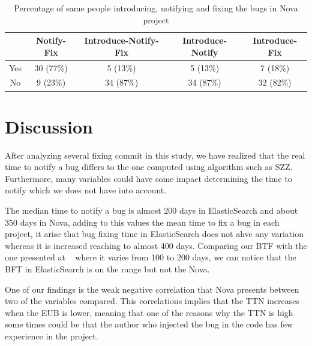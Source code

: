 \documentclass[10pt, conference]{IEEEtran}
\begin{document}
\begin{table}[!t]
\renewcommand{\arraystretch}{1.3}
\label{tableIII}
\centering
\caption{Percentage of same people introducing, notifying and fixing the bugs in Nova project}
\begin{tabular}{|c||c||c||c||c| }
\hline
  & Notify-Fix & Introduce-Notify-Fix & Introduce-Notify & Introduce-Fix \\
\hline
Yes & 30 (77\%) & 5 (13\%) & 5 (13\%) & 7 (18\%) \\
\hline
No & 9 (23\%) & 34 (87\%) & 34 (87\%) & 32 (82\%) \\
\hline
\end{tabular}
\end{table}
\section{Discussion}
\label{sec:discussion}

After analyzing several fixing commit in this study, we have realized that the real time to notify a bug differs to the one computed using algorithm such as SZZ. Furthermore, many variables could have some impact determining the time to notify which we does not have into account.

The median time to notify a bug is almost 200 days in ElasticSearch and about 350 days in Nova, adding to this values the mean time to fix a bug in each project, it arise that bug fixing time in ElasticSearch does not ahve any variation whereas it is increased reaching to almost 400 days. Comparing our BTF with the one presented at ~\cite{kim2006long} where it varies from 100 to 200 days, we can notice that the BFT in ElasticSearch is on the range but not the Nova. 

\vspace{0.2cm}
\vspace{0.1cm}

One of our findings is the weak negative correlation that Nova presents between two of the variables compared. This correlations implies that the TTN increases when the EUB is lower, meaning that one of the reasons why the TTN is high some times could be that the author who injected the bug in the code has few experience in the project.
\end{document}
